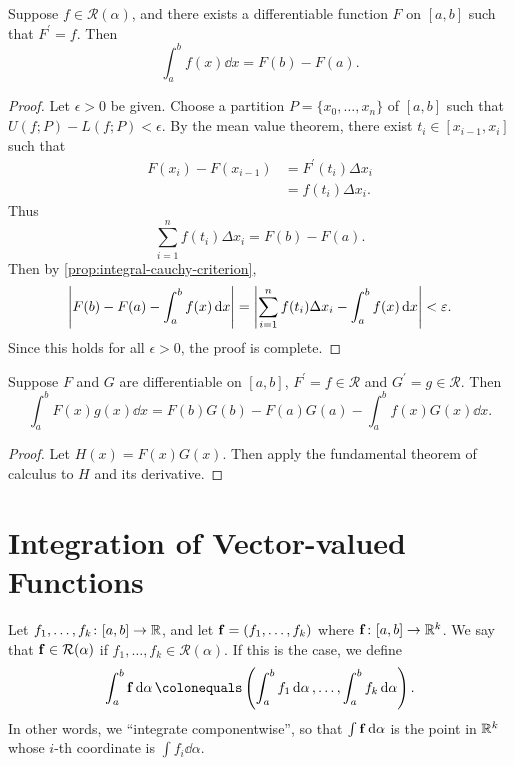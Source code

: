 \begin{theorem}
Suppose $f\in \mathcal{R}(\alpha)$, and there exists a differentiable function $F$ on $[a,b]$ such that $F^\prime=f$. Then
\begin{equation}
\int_a^b f(x)\dd{x}=F(b)-F(a).
\end{equation}
\end{theorem}

\begin{proof}
Let $\epsilon>0$ be given. Choose a partition $P=\{x_0,\dots,x_n\}$ of $[a,b]$ such that $U(f;P)-L(f;P)<\epsilon$. By the mean value theorem, there exist $t_i\in[x_{i-1},x_i]$ such that
\begin{align*}
F(x_i)-F(x_{i-1})
&=F^\prime(t_i)\Delta x_i\\
&=f(t_i)\Delta x_i.
\end{align*}
Thus
\[\sum_{i=1}^{n}f(t_i)\Delta x_i=F(b)-F(a).\]
Then by \ref{prop:integral-cauchy-criterion},
\[\left|F(b)-F(a)-\int_{a}^{b}f(x)\dd{x}\right|
=\left|\sum_{i=1}^{n}f(t_i)\Delta x_i-\int_{a}^{b}f(x)\dd{x}\right|
<\varepsilon.\]
Since this holds for all $\epsilon>0$, the proof is complete.
\end{proof}

\begin{lemma}
Suppose $F$ and $G$ are differentiable on $[a,b]$, $F^\prime=f\in\mathcal{R}$ and $G^\prime=g\in\mathcal{R}$. Then
\begin{equation}
\int_a^b F(x)g(x)\dd{x}=F(b)G(b)-F(a)G(a)-\int_a^b f(x)G(x)\dd{x}.
\end{equation}
\end{lemma}

\begin{proof}
Let $H(x)=F(x)G(x)$. Then apply the fundamental theorem of calculus to $H$ and its derivative.
\end{proof}
\pagebreak

\section{Integration of Vector-valued Functions}
Let $f_1,\dots,f_k\colon[a,b]\to\mathbb R$, and let $\vb{f}=(f_1,\dots,f_k)$ where $\vb{f}\colon[a,b]\to\mathbb R^k$. 
We say that $\vb{f}\in\mathcal{R}(\alpha)$ if $f_1,\dots,f_k\in\mathcal{R}(\alpha)$. If this is the case, we define
\[\int_{a}^{b}\vb{f}\dd{\alpha}\colonequals\brac{\int_{a}^{b}f_1\dd{\alpha},\dots,\int_{a}^{b}f_k\dd{\alpha}}.\]
In other words, we ``integrate componentwise'', so that $\int\vb{f}\dd{\alpha}$ is the point in $\mathbb R^k$ whose $i$-th coordinate is $\int f_i\dd{\alpha}$.

